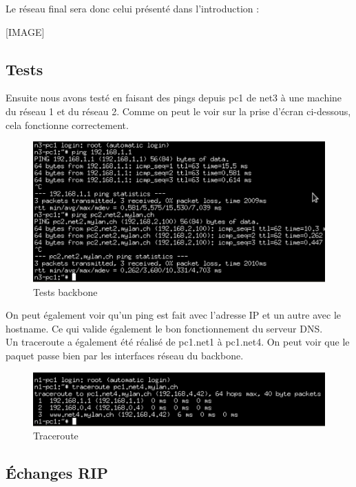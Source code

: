 \documentclass{article}
\begin{document}
Le réseau final sera donc celui présenté dans l'introduction : 

[IMAGE]

\subsection{Tests}

Ensuite nous avons testé en faisant des pings depuis pc1 de net3 à une machine du réseau 1 et du réseau 2. Comme on peut le voir sur la prise d'écran ci-dessous, cela fonctionne correctement.

\begin{figure}[!h]
	\centering
	\includegraphics{./captures/test-zebra-from-pc.png}
	\caption{Tests backbone}
	\label{fig:Tests backbone}
\end{figure}

On peut également voir qu'un ping est fait avec l'adresse IP et un autre avec le hostname. Ce qui valide également le bon fonctionnement du serveur DNS.\\

Un traceroute a également été réalisé de pc1.net1 à pc1.net4. On peut voir que le paquet passe bien par les interfaces réseau du backbone.

\begin{figure}[!h]
	\centering
	\includegraphics{./captures/traceroutepc1-net4.png}
	\caption{Traceroute}
	\label{fig:Traceroute}
\end{figure}

\clearpage

\subsection{Échanges RIP}
\end{document}
